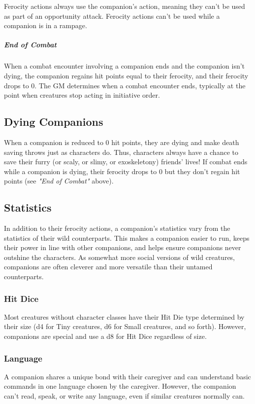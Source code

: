\documentclass[10pt,a4paper,twoside,bg=print,twocolumn,openany,nodeprecatedcode]{dndbook}
\begin{document}
Ferocity actions always use the companion's action, meaning they can't be used as part of an opportunity attack. Ferocity actions can't be used while a companion is in a rampage.

\subparagraph{End of Combat}
When a combat encounter involving a companion ends and the companion isn't dying, the companion regains hit points equal to their ferocity, and their ferocity drops to 0. The GM determines when a combat encounter ends, typically at the point when creatures stop acting in initiative order.

\subsection{Dying Companions}
When a companion is reduced to 0 hit points, they are dying and make death saving throws just as characters do. Thus, characters always have a chance to save their furry (or scaly, or slimy, or exoskeletony) friends' lives! If combat ends while a companion is dying, their ferocity drops to 0 but they don't regain hit points (see \textit{"End of Combat"} above).

\subsection{Statistics}
In addition to their ferocity actions, a companion's statistics vary from the statistics of their wild counterparts. This makes a companion easier to run, keeps their power in line with other companions, and helps ensure companions never outshine the characters. As somewhat more social versions of wild creatures, companions are often cleverer and more versatile than their untamed counterparts.

\subsubsection{Hit Dice}
Most creatures without character classes have their Hit Die type determined by their size (d4 for Tiny creatures, d6 for Small creatures, and so forth). However, companions are special and use a d8 for Hit Dice regardless of size.

\subsubsection{Language}
A companion shares a unique bond with their caregiver and can understand basic commands in one language chosen by the caregiver. However, the companion can't read, speak, or write any language, even if similar creatures normally can.
\end{document}
